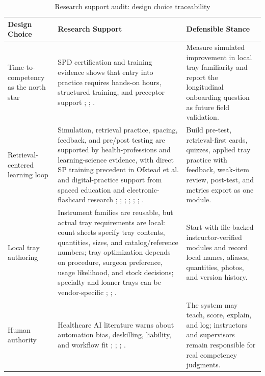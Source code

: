 \documentclass[10pt,a4paper]{article}
\begin{document}
\begin{table}[H]
\centering
\caption{Research support audit: design choice traceability}
\label{tab:research-support-audit-design-choice-traceability}
\small\renewcommand{\arraystretch}{1.2}\setlength{\tabcolsep}{4pt}
\begin{tabularx}{\textwidth}{|>{\raggedright\arraybackslash}X|>{\raggedright\arraybackslash}X|>{\raggedright\arraybackslash}X|}
\hline
Design Choice & Research Support & Defensible Stance \\
\hline
Time-to-competency as the north star & SPD certification and training evidence shows that entry into practice requires hands-on hours, structured training, and preceptor support \cite{hspa-crcst-accessed-2026}; \cite{chobin-2010}; \cite{aorn-staffing-shortage-2025}. & Measure simulated improvement in local tray familiarity and report the longitudinal onboarding question as future field validation. \\
\hline
Retrieval-centered learning loop & Simulation, retrieval practice, spacing, feedback, and pre/post testing are supported by health-professions and learning-science evidence, with direct SP training precedent in Ofstead et al. and digital-practice support from spaced education and electronic-flashcard research \cite{ofstead-et-al-2023}; \cite{cook-et-al-2011}; \cite{roediger-and-karpicke-2006}; \cite{larsen-et-al-2009}; \cite{martinengo-et-al-2024}; \cite{barrison-et-al-2025}; \cite{hattie-and-timperley-2007}. & Build pre-test, retrieval-first cards, quizzes, applied tray practice with feedback, weak-item review, post-test, and metrics export as one module. \\
\hline
Local tray authoring & Instrument families are reusable, but actual tray requirements are local: count sheets specify tray contents, quantities, sizes, and catalog/reference numbers; tray optimization depends on procedure, surgeon preference, usage likelihood, and stock decisions; specialty and loaner trays can be vendor-specific \cite{nadeau-2024}; \cite{dos-santos-et-al-2021}; \cite{ahmadi-et-al-2023}. & Start with file-backed instructor-verified modules and record local names, aliases, quantities, photos, and version history. \\
\hline
Human authority & Healthcare AI literature warns about automation bias, deskilling, liability, and workflow fit \cite{goddard-et-al-2012}; \cite{natali-et-al-2025}; \cite{kelly-2026}; \cite{zheng-et-al-2023}. & The system may teach, score, explain, and log; instructors and supervisors remain responsible for real competency judgments. \\

\end{tabularx}
\end{table}
\end{document}
